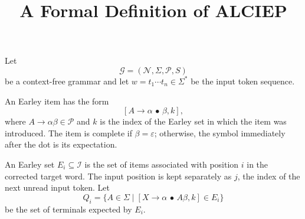 \documentclass[11pt,a4paper]{article}
\title{A Formal Definition of ALCIEP}
\author{}
\date{}
\newcommand{\Grammar}{\mathcal{G}}
\newcommand{\NonTerminals}{\mathcal{N}}
\newcommand{\Terminals}{\Sigma}
\newcommand{\Rules}{\mathcal{P}}
\newcommand{\Items}{\mathcal{I}}
\begin{document}
\maketitle

Let
\[
  \Grammar=(\NonTerminals,\Terminals,\Rules,S)
\]
be a context-free grammar and let
$w=t_1\cdots t_n\in\Terminals^{*}$ be the input token sequence.

An Earley item has the form
\[
  [A\to\alpha\,\bullet\,\beta, k],
\]
where $A\to\alpha\beta\in\Rules$ and $k$ is the index of the Earley set in
which the item was introduced.  The item is complete if $\beta=\varepsilon$;
otherwise, the symbol immediately after the dot is its expectation.

An Earley set $E_i\subseteq\Items$ is the set of items associated with
position $i$ in the corrected target word.  The input position is kept
separately as $j$, the index of the next unread input token.  Let
\[
  Q_i=\{A\in\Terminals\mid
       [X\to\alpha\,\bullet\,A\beta,k]\in E_i\}
\]
be the set of terminals expected by $E_i$.
\end{document}
